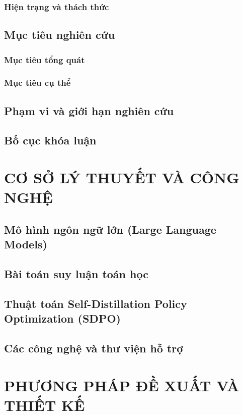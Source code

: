 \documentclass[12pt,a4paper]{report}
\begin{document}
\subsection{Hiện trạng và thách thức}
\section{Mục tiêu nghiên cứu}
\subsection{Mục tiêu tổng quát}
\subsection{Mục tiêu cụ thể}
\section{Phạm vi và giới hạn nghiên cứu}
\section{Bố cục khóa luận}

\chapter{CƠ SỞ LÝ THUYẾT VÀ CÔNG NGHỆ}
\section{Mô hình ngôn ngữ lớn (Large Language Models)}
\section{Bài toán suy luận toán học}
\section{Thuật toán Self-Distillation Policy Optimization (SDPO)}
\section{Các công nghệ và thư viện hỗ trợ}

\chapter{PHƯƠNG PHÁP ĐỀ XUẤT VÀ THIẾT KẾ}
\end{document}
